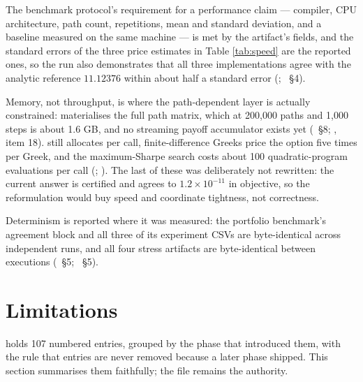 \documentclass[11pt,a4paper]{article}
\begin{document}
The benchmark protocol's requirement for a performance claim --- compiler, CPU architecture,
path count, repetitions, mean and standard deviation, and a baseline measured on the same
machine --- is met by the artifact's fields, and the standard errors of the three price
estimates in Table \ref{tab:speed} are the reported ones, so the run also demonstrates that all
three implementations agree with the analytic reference $11.12376$ within about half a standard
error (;
~\S4).

Memory, not throughput, is where the path-dependent layer is actually constrained:
 materialises the full path matrix, which at 200{,}000 paths and
1{,}000 steps is about 1.6 GB, and no streaming payoff accumulator exists yet
(~\S8;
, item 18).  still allocates per
call, finite-difference Greeks price the option five times per Greek, and the maximum-Sharpe
search costs about 100 quadratic-program evaluations per call
(;
). The last of these was
deliberately not rewritten: the current answer is certified and agrees to
$1.2\times 10^{-11}$ in objective, so the reformulation would buy speed and coordinate
tightness, not correctness.

Determinism is reported where it was measured: the portfolio benchmark's agreement block and
all three of its experiment CSVs are byte-identical across independent runs, and all four
stress artifacts are byte-identical between executions
(~\S5;
~\S5).

\section{Limitations}
\label{sec:limitations}

 holds 107 numbered entries, grouped by the phase that introduced them,
with the rule that entries are never removed because a later phase shipped. This section
summarises them faithfully; the file remains the authority.
\end{document}
